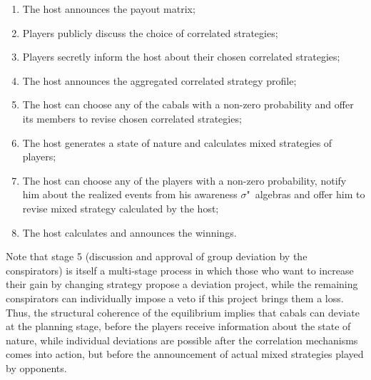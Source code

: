 \begin{enumerate}
	\item The host announces the payout matrix; %
	\item Players publicly discuss the choice of correlated strategies; %
	\item Players secretly inform the host about their chosen correlated strategies; %
	\item The host announces the aggregated correlated strategy profile; %
	\item The host can choose any of the cabals with a non-zero probability and offer its members to revise chosen correlated strategies; %
	\item The host generates a state of nature and calculates mixed strategies of players; %
	\item The host can choose any of the players with a non-zero probability, notify him about the realized events from his awareness $\sigma$"~algebras and offer him to revise mixed strategy calculated by the host; %
	\item The host calculates and announces the winnings. %
\end{enumerate}

Note that stage 5 (discussion and approval of group deviation by the conspirators) is itself a multi-stage process in which those who want to increase their gain by changing strategy propose a deviation project, while the remaining conspirators can individually impose a veto if this project brings them a loss. Thus, the structural coherence of the equilibrium implies that cabals can deviate at the planning stage, before the players receive information about the state of nature, while individual deviations are possible after the correlation mechanisms comes into action, but before the announcement of actual mixed strategies played by opponents. %

